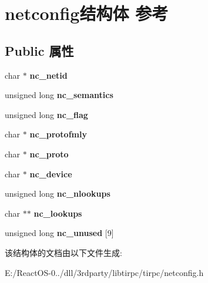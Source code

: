 \hypertarget{structnetconfig}{}\section{netconfig结构体 参考}
\label{structnetconfig}
\subsection*{Public 属性}
\begin{DoxyCompactItemize}
\item 
\mbox{\label{structnetconfig_a84dad49e4a7feb93e606b4b9b20d153c}} 
char $\ast$ {\bfseries nc\+\_\+netid}
\item 
\mbox{\label{structnetconfig_a595c77a86c913a0c181f67b7d6d6e655}} 
unsigned long {\bfseries nc\+\_\+semantics}
\item 
\mbox{\label{structnetconfig_a74bcd569495748c45a52f30dfc252bc2}} 
unsigned long {\bfseries nc\+\_\+flag}
\item 
\mbox{\label{structnetconfig_ad0840341f4963b6bb75a6df7f6ecfca2}} 
char $\ast$ {\bfseries nc\+\_\+protofmly}
\item 
\mbox{\label{structnetconfig_ad6c74acbd64ad60d97d7d0121260e2e8}} 
char $\ast$ {\bfseries nc\+\_\+proto}
\item 
\mbox{\label{structnetconfig_ade52162e9fec5671e363f6384b9465b1}} 
char $\ast$ {\bfseries nc\+\_\+device}
\item 
\mbox{\label{structnetconfig_a03851369bd503e8e004d39e911fb3a5e}} 
unsigned long {\bfseries nc\+\_\+nlookups}
\item 
\mbox{\label{structnetconfig_af1493797bc302dcb5e1a3db1e4c970ab}} 
char $\ast$$\ast$ {\bfseries nc\+\_\+lookups}
\item 
\mbox{\label{structnetconfig_a9c5d50c00129d779f42207b2b80458ad}} 
unsigned long {\bfseries nc\+\_\+unused} \mbox{[}9\mbox{]}
\end{DoxyCompactItemize}


该结构体的文档由以下文件生成\+:\begin{DoxyCompactItemize}
\item 
E\+:/\+React\+O\+S-\/0../dll/3rdparty/libtirpc/tirpc/netconfig.\+h\end{DoxyCompactItemize}
